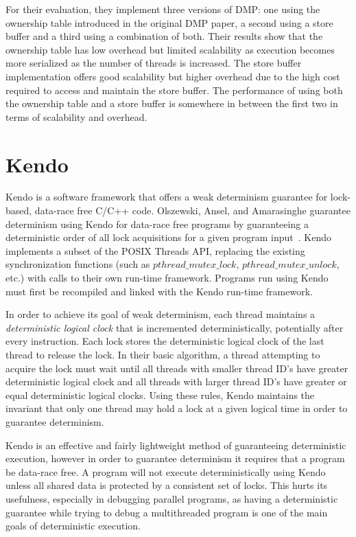 For their evaluation, they implement three versions of DMP: one using
the ownership table introduced in the original DMP paper, a second
using a store buffer and a third using a combination of both.  Their
results show that the ownership table has low overhead but limited
scalability as execution becomes more serialized as the number of
threads is increased.  The store buffer implementation offers good
scalability but higher overhead due to the high cost required to
access and maintain the store buffer.  The performance of using both
the ownership table and a store buffer is somewhere in between the
first two in terms of scalability and overhead.

\section{Kendo}

Kendo is a software framework that offers a weak determinism guarantee
for lock-based, data-race free C/C++ code.  Olszewski, Ansel, and
Amarasinghe guarantee determinism using Kendo for data-race free
programs by guaranteeing a deterministic order of all lock
acquisitions for a given program input~\cite{kendo}.  Kendo implements
a subset of the POSIX Threads API, replacing the existing
synchronization functions (such as $pthread\_mutex\_lock$,
$pthread\_mutex\_unlock$, etc.) with calls to their own run-time
framework.  Programs run using Kendo must first be recompiled and
linked with the Kendo run-time framework.

In order to achieve its goal of weak determinism, each thread
maintains a \emph{deterministic logical clock} that is incremented
deterministically, potentially after every instruction.  Each lock
stores the deterministic logical clock of the last thread to release
the lock.  In their basic algorithm, a thread attempting to acquire
the lock must wait until all threads with smaller thread ID's have
greater deterministic logical clock and all threads with larger thread
ID's have greater or equal deterministic logical clocks.  Using these
rules, Kendo maintains the invariant that only one thread may hold a
lock at a given logical time in order to guarantee determinism.

Kendo is an effective and fairly lightweight method of guaranteeing
deterministic execution, however in order to guarantee determinism it
requires that a program be data-race free.  A program will not execute
deterministically using Kendo unless all shared data is protected by a
consistent set of locks.  This hurts its usefulness, especially in
debugging parallel programs, as having a deterministic guarantee while
trying to debug a multithreaded program is one of the main goals of
deterministic execution.

